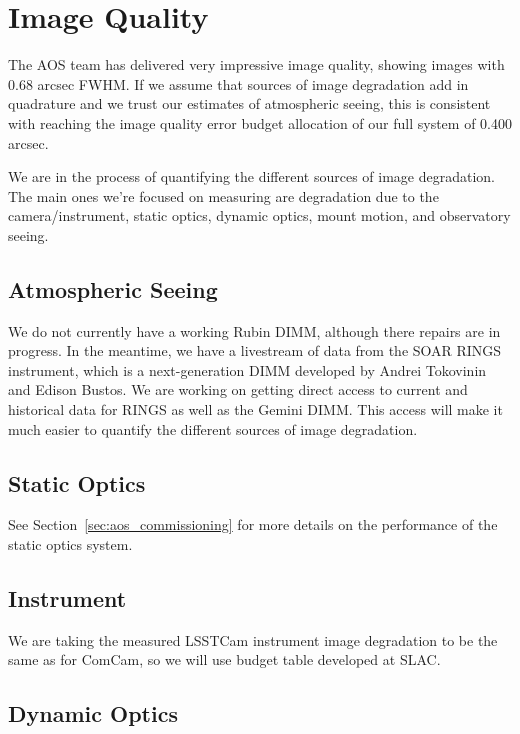 \section{Image Quality}
\label{sec:image_quality}

The AOS team has delivered very impressive image quality, showing images with 0.68 arcsec FWHM. If we assume that sources of image degradation add in quadrature and we trust our estimates of atmospheric seeing, this is consistent with reaching the image quality error budget allocation of our full system of 0.400 arcsec.

We are in the process of quantifying the different sources of image degradation. The main ones we're focused on measuring are degradation due to the camera/instrument, static optics, dynamic optics, mount motion, and observatory seeing.

\subsection{Atmospheric Seeing}

We do not currently have a working Rubin DIMM, although there repairs are in progress. In the meantime, we have a livestream of data from the SOAR RINGS instrument, which is a  next-generation DIMM developed by Andrei Tokovinin and Edison Bustos. We are working on getting direct access to current and historical data for RINGS as well as the Gemini DIMM. This access will make it much easier to quantify the different sources of image degradation.

\subsection{Static Optics}

See Section~\ref{sec:aos_commissioning} for more details on the performance of the static optics system.

\subsection{Instrument}

We are taking the measured LSSTCam instrument image degradation to be the same as for ComCam, so we will use budget table developed at SLAC.

\subsection{Dynamic Optics}


